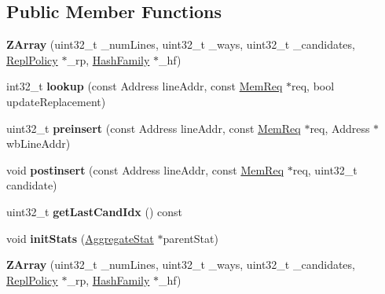 \subsection*{Public Member Functions}
\begin{DoxyCompactItemize}
\item 
\hypertarget{classZArray_afb8be1ac5cb0b39004e99ff723e26b50}{{\bfseries Z\-Array} (uint32\-\_\-t \-\_\-num\-Lines, uint32\-\_\-t \-\_\-ways, uint32\-\_\-t \-\_\-candidates, \hyperlink{classReplPolicy}{Repl\-Policy} $\ast$\-\_\-rp, \hyperlink{classHashFamily}{Hash\-Family} $\ast$\-\_\-hf)}\label{classZArray_afb8be1ac5cb0b39004e99ff723e26b50}

\item 
\hypertarget{classZArray_afbacb82458862d0eced5d9419f352815}{int32\-\_\-t {\bfseries lookup} (const Address line\-Addr, const \hyperlink{structMemReq}{Mem\-Req} $\ast$req, bool update\-Replacement)}\label{classZArray_afbacb82458862d0eced5d9419f352815}

\item 
\hypertarget{classZArray_ab6ac38b3f726386bf451d23e25cc0f92}{uint32\-\_\-t {\bfseries preinsert} (const Address line\-Addr, const \hyperlink{structMemReq}{Mem\-Req} $\ast$req, Address $\ast$wb\-Line\-Addr)}\label{classZArray_ab6ac38b3f726386bf451d23e25cc0f92}

\item 
\hypertarget{classZArray_a1a85633b823d1ca9626763d9b5411f4c}{void {\bfseries postinsert} (const Address line\-Addr, const \hyperlink{structMemReq}{Mem\-Req} $\ast$req, uint32\-\_\-t candidate)}\label{classZArray_a1a85633b823d1ca9626763d9b5411f4c}

\item 
\hypertarget{classZArray_a11b052fd25fe70479e9026f26886cdaf}{uint32\-\_\-t {\bfseries get\-Last\-Cand\-Idx} () const }\label{classZArray_a11b052fd25fe70479e9026f26886cdaf}

\item 
\hypertarget{classZArray_ab5adc62a1e1440d3517f3fe9c486915d}{void {\bfseries init\-Stats} (\hyperlink{classAggregateStat}{Aggregate\-Stat} $\ast$parent\-Stat)}\label{classZArray_ab5adc62a1e1440d3517f3fe9c486915d}

\item 
\hypertarget{classZArray_afb8be1ac5cb0b39004e99ff723e26b50}{{\bfseries Z\-Array} (uint32\-\_\-t \-\_\-num\-Lines, uint32\-\_\-t \-\_\-ways, uint32\-\_\-t \-\_\-candidates, \hyperlink{classReplPolicy}{Repl\-Policy} $\ast$\-\_\-rp, \hyperlink{classHashFamily}{Hash\-Family} $\ast$\-\_\-hf)}\label{classZArray_afb8be1ac5cb0b39004e99ff723e26b50}


\end{DoxyCompactItemize}
